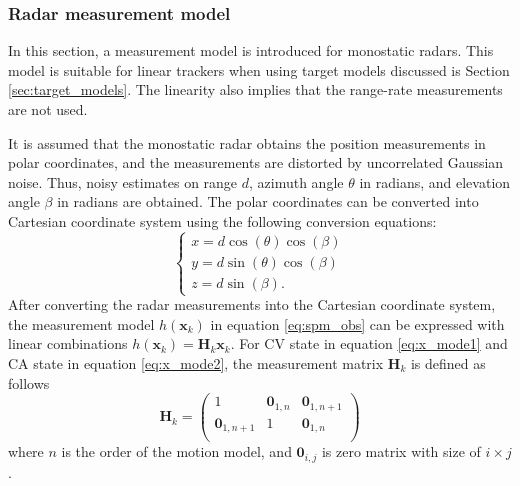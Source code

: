 \documentclass[english, 12pt, a4paper, elec, utf8, a-1b, online]{aaltothesis}
\renewcommand{\vec}[1]{\mathbf{#1}}
\newcommand{\x}{\vec{x}_k}
\newcommand{\omodel}{\vec{H}_k}
\begin{document}
\subsubsection{Radar measurement model} \label{sec:measurement_model}

In this section, a measurement model is introduced for monostatic radars.
This model is suitable for linear trackers when using target models discussed is Section \ref{sec:target_models}.
The linearity also implies that the range-rate measurements are not used.

It is assumed that the monostatic radar obtains the position measurements in polar coordinates, and the measurements are distorted by uncorrelated Gaussian noise.
Thus, noisy estimates on range $d$, azimuth angle $\theta$ in radians, and elevation angle $\beta$ in radians are obtained.
The polar coordinates can be converted into Cartesian coordinate system using the following conversion equations:
\begin{equation}
\left\{
\begin{array}{l}
    x = d \cos(\theta) \cos(\beta) \\
    y = d \sin(\theta) \cos(\beta) \\
    z = d \sin(\beta).
\end{array}\right.
\end{equation}
After converting the radar measurements into the Cartesian coordinate system, the measurement model $h(\x)$ in equation \eqref{eq:spm_obs} can be expressed with linear combinations $h(\x) = \omodel \x$.
For CV state in equation \eqref{eq:x_mode1} and CA state in equation \eqref{eq:x_mode2}, the measurement matrix $\omodel$ is defined as follows
\begin{equation}\label{eq:position_measurement_matrix}
    \omodel = 
       \begin{pmatrix}
            1 & \vec{0}_{1, n} & \vec{0}_{1, n+1}\\ 
            \vec{0}_{1, n+1} & 1 & \vec{0}_{1, n}\\ 
        \end{pmatrix}
\end{equation}
where $n$ is the order of the motion model, and $\vec{0}_{i,j}$ is zero matrix with size of $i\times j$.
\end{document}

